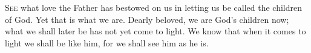 
\lettrine{S}{ee} what love the Father has bestowed on us
in letting us be called the children of God.
Yet that is what we are.
Dearly beloved,
we are God’s children now;
what we shall later be has not yet come to light.
We know that when it comes to light
we shall be like him,
for we shall see him as he is.